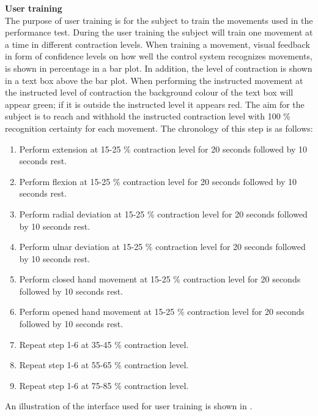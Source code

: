 \textbf{User training} \\ %
The purpose of user training is for the subject to train the movements used in the performance test. During the user training the subject will train one movement at a time in different contraction levels. When training a movement, visual feedback in form of confidence levels on how well the control system recognizes movements, is shown in percentage in a bar plot. In addition, the level of contraction is shown in a text box above the bar plot. When performing the instructed movement at the instructed level of contraction the background colour of the text box will appear green; if it is outside the instructed level it appears red. The aim for the subject is to reach and withhold the instructed contraction level with 100 \% recognition certainty for each movement. The chronology of this step is as follows:

\begin{enumerate}
	\item Perform extension at 15-25 \% contraction level for 20 seconds followed by 10 seconds rest.
	\item Perform flexion at 15-25 \% contraction level for 20 seconds followed by 10 seconds rest.
	\item Perform radial deviation at 15-25 \% contraction level for 20 seconds followed by 10 seconds rest.
	\item Perform ulnar deviation at 15-25 \% contraction level for 20 seconds followed by 10 seconds rest.
	\item Perform closed hand movement at 15-25 \% contraction level for 20 seconds followed by 10 seconds rest.
	\item Perform opened hand movement at 15-25 \% contraction level for 20 seconds followed by 10 seconds rest.
	\item Repeat step 1-6 at 35-45 \% contraction level.
	\item Repeat step 1-6 at 55-65 \% contraction level.
	\item Repeat step 1-6 at 75-85 \% contraction level.
\end{enumerate} 

An illustration of the interface used for user training is shown in .

